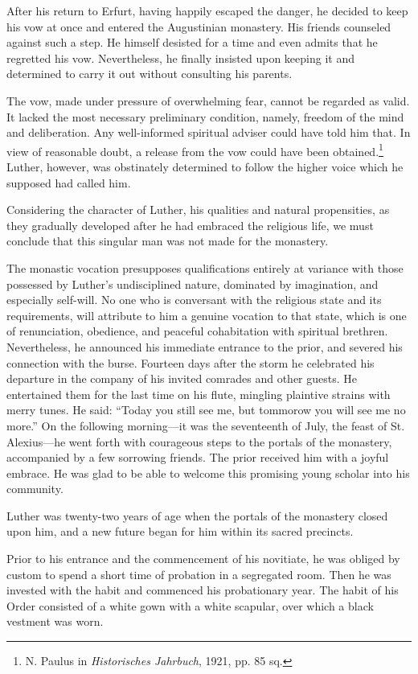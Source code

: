 After his return to Erfurt, having happily escaped the danger,
he decided to keep his vow at once and entered the Augustinian
monastery. His friends counseled against such a step. He himself
desisted for a time and even admits that he regretted his vow. Nevertheless, he finally insisted upon keeping it and determined to carry it
out without consulting his parents.

The vow, made under pressure of overwhelming fear, cannot be
regarded as valid. It lacked the most necessary preliminary condition,
namely, freedom of the mind and deliberation. Any well-informed
spiritual adviser could have told him that. In view of reasonable doubt,
a release from the vow could have been obtained.\footnote
{N. Paulus in \textit{Historisches Jahrbuch}, 1921, pp. 85 sq.}
Luther, however, was obstinately determined to follow the higher voice which he supposed had called him.

Considering the character of Luther, his qualities and natural
propensities, as they gradually developed after he had embraced the
religious life, we must conclude that this singular man was not made
for the monastery.

The monastic vocation presupposes qualifications entirely at variance with
those possessed by Luther’s undisciplined nature, dominated
by imagination, and especially self-will. No one who is conversant
with the religious state and its requirements, will attribute to him
a genuine vocation to that state, which is one of renunciation,
obedience, and peaceful cohabitation with spiritual brethren.
Nevertheless, he announced his immediate entrance to the prior, and
severed his connection with the burse. Fourteen days after the storm
he celebrated his departure in the company of his invited comrades
and other guests. He entertained them for the last time on his flute,
mingling plaintive strains with merry tunes. He said: “Today you
still see me, but tommorow you will see me no more.” On the following
morning—it was the seventeenth of July, the feast of St.
Alexius—he went forth with courageous steps to the portals of the
monastery, accompanied by a few sorrowing friends. The prior received
him with a joyful embrace. He was glad to be able to welcome
this promising young scholar into his community.

Luther was twenty-two years of age when the portals of the
monastery closed upon him, and a new future began for him within
its sacred precincts.

Prior to his entrance and the commencement of his novitiate, he
was obliged by custom to spend a short time of probation in a
segregated room. Then he was invested with the habit and commenced
his probationary year. The habit of his Order consisted of a white
gown with a white scapular, over which a black vestment was worn.

